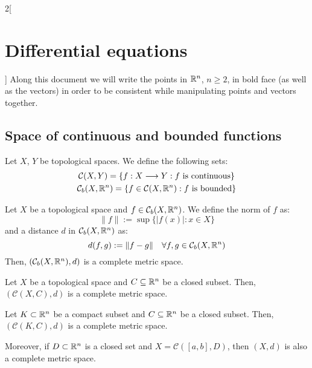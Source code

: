 \documentclass[../../../main.tex]{subfiles}
\begin{document}
\begin{multicols}{2}[\section{Differential equations}]
    Along this document we will write the points in $\mathbb{R}^n$, $n\geq 2$, in bold face (as well as the vectors) in order to be consistent while manipulating points and vectors together.
    \subsection{Space of continuous and bounded functions}
    \begin{definition}
        Let $X$, $Y$ be topological spaces. We define the following sets:
        \begin{gather*}
            \mathcal{C}(X,Y)=\{f:X\longrightarrow Y:f\text{ is continuous}\}\\
            \mathcal{C}_b(X,\mathbb{R}^n)=\{f\in\mathcal{C}(X,\mathbb{R}^n):f\text{ is bounded}\}
        \end{gather*}
    \end{definition}
    \begin{theorem}
        Let $X$ be a topological space and $f\in\mathcal{C}_b(X,\mathbb{R}^n)$. We define the norm of $f$ as: $$\|f\|:=\sup\{|f(x)|:x\in X\}$$ and a distance $d$ in $\mathcal{C}_b(X,\mathbb{R}^n)$ as: $$d(f,g):=\|f-g\|\quad\forall f,g\in\mathcal{C}_b(X,\mathbb{R}^n)$$
        Then, $(\mathcal{C}_b(X,\mathbb{R}^n),d)$ is a complete metric space.
    \end{theorem}
    \begin{theorem}
        Let $X$ be a topological space and $C\subseteq\mathbb{R}^n$ be a closed subset. Then, $(\mathcal{C}(X,C),d)$ is a complete metric space.
    \end{theorem}
    \begin{corollary}
        Let $K\subset \mathbb{R}^n$ be a compact subset and $C\subseteq\mathbb{R}^n$ be a closed subset. Then, $(\mathcal{C}(K,C),d)$ is a complete metric space.
    \end{corollary}
    \begin{corollary}
        Moreover, if $D\subset\mathbb{R}^n$ is a closed set and $X=\mathcal{C}([a,b],D)$, then $(X,d)$ is also a complete metric space.
    \end{corollary}

\end{multicols}
\end{document}

